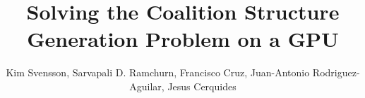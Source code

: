 \documentclass{llncs}
\begin{document}


\title{Solving the Coalition Structure Generation Problem on a GPU}




%
%
%
%

%


%
\author{Kim Svensson, Sarvapali D. Ramchurn, Francisco Cruz, Juan-Antonio Rodriguez-Aguilar, Jesus Cerquides}
\end{document}
